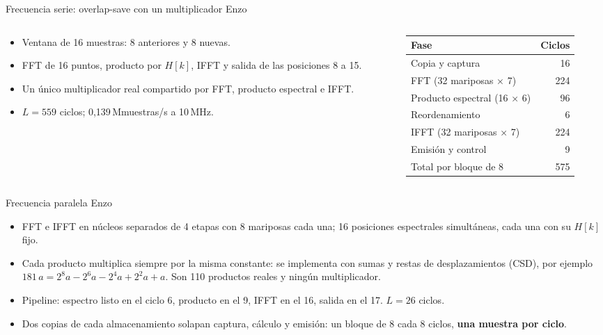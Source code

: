 \documentclass[aspectratio=169,11pt]{beamer}
\newcommand{\presenta}[1]{\hfill{\normalfont\small\color{gray}#1}}
\begin{document}
\begin{frame}{Frecuencia serie: overlap-save con un multiplicador \presenta{Enzo}}
  \begin{columns}[T]
    \begin{column}{0.5\textwidth}
      \begin{itemize}
        \item Ventana de 16 muestras: 8 anteriores y 8 nuevas.
        \item FFT de 16 puntos, producto por $H[k]$, IFFT y salida de las posiciones 8 a 15.
        \item Un único multiplicador real compartido por FFT, producto espectral e IFFT.
        \item $L = 559$ ciclos; 0,139\,Mmuestras/s a 10\,MHz.
      \end{itemize}
    \end{column}
    \begin{column}{0.45\textwidth}
      \small
      \begin{tabular}{lr}
        \toprule
        Fase & Ciclos \\
        \midrule
        Copia y captura & 16 \\
        FFT (32 mariposas × 7) & 224 \\
        Producto espectral (16 × 6) & 96 \\
        Reordenamiento & 6 \\
        IFFT (32 mariposas × 7) & 224 \\
        Emisión y control & 9 \\
        \midrule
        Total por bloque de 8 & 575 \\
        \bottomrule
      \end{tabular}
    \end{column}
  \end{columns}
\end{frame}

\begin{frame}{Frecuencia paralela \presenta{Enzo}}
  \begin{itemize}
    \item FFT e IFFT en núcleos separados de 4 etapas con 8 mariposas cada una; 16 posiciones espectrales simultáneas, cada una con su $H[k]$ fijo.
    \item Cada producto multiplica siempre por la misma constante: se implementa con sumas y restas de desplazamientos (CSD), por ejemplo $181\,a = 2^8 a - 2^6 a - 2^4 a + 2^2 a + a$. Son 110 productos reales y ningún multiplicador.
    \item Pipeline: espectro listo en el ciclo 6, producto en el 9, IFFT en el 16, salida en el 17. $L = 26$ ciclos.
    \item Dos copias de cada almacenamiento solapan captura, cálculo y emisión: un bloque de 8 cada 8 ciclos, \textbf{una muestra por ciclo}.
  \end{itemize}
\end{frame}
\end{document}

